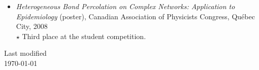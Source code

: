 \documentclass[11pt]{article}
\begin{document}
\begin{itemize}
%
  \item \textit{Heterogeneous Bond Percolation on Complex Networks: Application to Epidemiology} (poster), Canadian Association of Physicists Congress, Qu\'ebec City, 2008\\
  {\small $\star$ Third place at the student competition.}\\
%
%
\end{itemize}
%
%
%
%
%
\vfill
%
\begin{flushright}
  \tiny Last modified\\ \today
\end{flushright}
%
\end{document}
